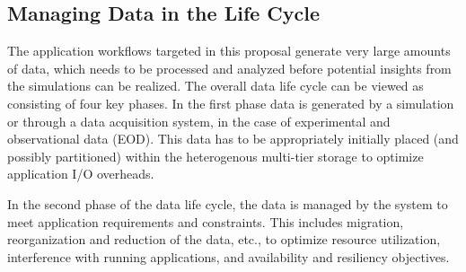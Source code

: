\subsection{Managing Data in the Life Cycle}
\label{sec:managing-data-life}

\newcommand{\Sir}{Sirocco} %


The application workflows targeted in this proposal generate very large
amounts of data, which needs to be processed and analyzed before
potential insights from the simulations can be realized. 
The overall data life cycle can be viewed as consisting of four key phases. In the first phase data 
is generated by a simulation or through a data acquisition system,
in the case of experimental and observational data (EOD). This data has 
to be appropriately initially placed (and possibly partitioned) within the heterogenous 
multi-tier storage to optimize application I/O overheads.

In the second phase of the data life cycle, the data is managed by the system to 
meet application requirements and constraints. This includes migration, 
reorganization and reduction of the data, etc., to optimize resource
utilization, interference with running applications, and availability and
resiliency objectives. 
%

